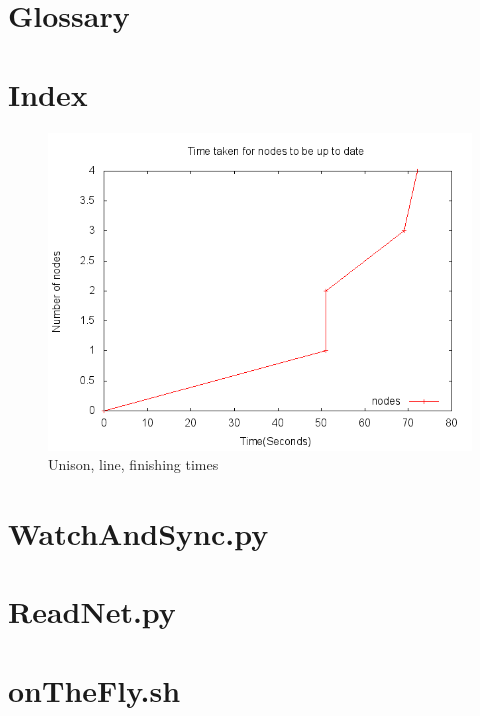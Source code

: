\documentclass[12pt]{article}
\begin{document}
\section{Glossary}

\section{Index}

\appendix

\begin{figure}[htp]
    \centering
    \includegraphics[scale=0.5]{images/fintime.png}
    \caption{Unison, line, finishing times}
    \label{fig:fintime_graph}
\end{figure}

\section{WatchAndSync.py}


\section{ReadNet.py}


\section{onTheFly.sh}

\end{document}
